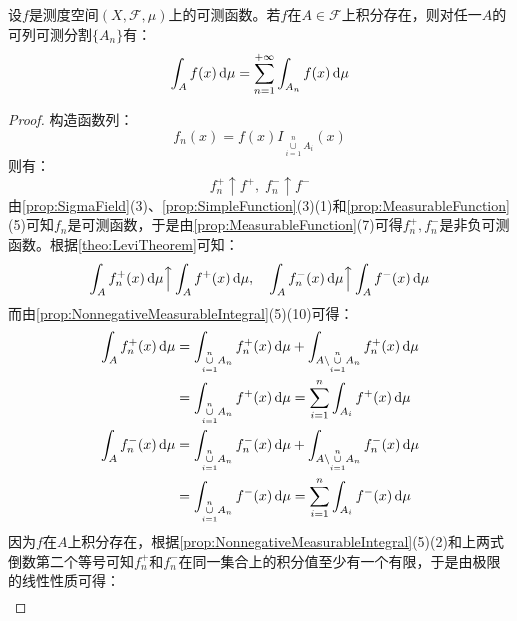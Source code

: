 \begin{theorem}\label{theo:MeasurableCountableIntegral}
	设$f$是测度空间$(X,\mathscr{F},\mu)$上的可测函数。若$f$在$A\in\mathscr{F}$上积分存在，则对任一$A$的可列可测分割$\{A_n\}$有：
	\begin{equation*}
		\int_{A}f(x)\mathop{}\!\mathrm{d}\mu=\sum_{n=1}^{+\infty}\int_{A_n}f(x)\mathop{}\!\mathrm{d}\mu
	\end{equation*}
\end{theorem}
\begin{proof}
	构造函数列：
	\begin{equation*}
		f_n(x)=f(x)I_{\underset{i=1}{\overset{n}{\cup}}A_i}(x)
	\end{equation*}
	则有：
	\begin{equation*}
		f_n^+\uparrow f^+,\;f_n^-\uparrow f^-
	\end{equation*}
	由\cref{prop:SigmaField}(3)、\cref{prop:SimpleFunction}(3)(1)和\cref{prop:MeasurableFunction}(5)可知$f_n$是可测函数，于是由\cref{prop:MeasurableFunction}(7)可得$f_n^+,f_n^-$是非负可测函数。根据\cref{theo:LeviTheorem}可知：
	\begin{equation*}
		\int_{A}f_n^+(x)\mathop{}\!\mathrm{d}\mu\Big\uparrow\int_{A}f^+(x)\mathop{}\!\mathrm{d}\mu,\quad\int_{A}f_n^-(x)\mathop{}\!\mathrm{d}\mu\Big\uparrow\int_{A}f^-(x)\mathop{}\!\mathrm{d}\mu
	\end{equation*}
	而由\cref{prop:NonnegativeMeasurableIntegral}(5)(10)可得：
	\begin{gather*}
		\begin{aligned}
			\int_{A}f_n^+(x)\dif\mu
			&=\int_{\underset{i=1}{\overset{n}{\cup}}A_n}f_n^+(x)\dif\mu+\int_{A\backslash\underset{i=1}{\overset{n}{\cup}}A_n}f_n^+(x)\dif\mu \\
			&=\int_{\underset{i=1}{\overset{n}{\cup}}A_n}f^+(x)\dif\mu
			=\sum_{i=1}^{n}\int_{A_i}f^+(x)\dif\mu
		\end{aligned} \\
		\begin{aligned}
			\int_{A}f_n^-(x)\dif\mu
			&=\int_{\underset{i=1}{\overset{n}{\cup}}A_n}f_n^-(x)\dif\mu+\int_{A\backslash\underset{i=1}{\overset{n}{\cup}}A_n}f_n^-(x)\dif\mu \\
			&=\int_{\underset{i=1}{\overset{n}{\cup}}A_n}f^-(x)\dif\mu
			=\sum_{i=1}^{n}\int_{A_i}f^-(x)\dif\mu
		\end{aligned} 
	\end{gather*}
	因为$f$在$A$上积分存在，根据\cref{prop:NonnegativeMeasurableIntegral}(5)(2)和上两式倒数第二个等号可知$f_n^+$和$f_n^-$在同一集合上的积分值至少有一个有限，于是由极限的线性性质可得：
	\begin{align*}

\end{align*}
\end{proof}
